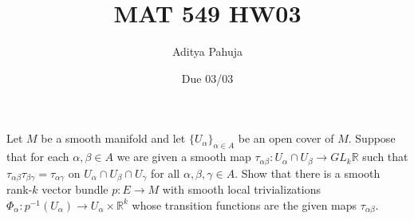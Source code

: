 \documentclass[10pt]{article}
\title{MAT 549 HW03}
\author{\large Aditya Pahuja}
\date{\large Due 03/03}
\providecommand{\RR}{\mathbb R}
\providecommand{\inv}{^{-1}}
\begin{document}
\maketitle

\begin{problem}
    Let $M$ be a smooth manifold and let $\{U_\alpha\}_{\alpha\in A}$
    be an open cover of $M$. Suppose that for each
    $\alpha,\beta\in A$ we are given a smooth map
    $\tau_{\alpha\beta}\colon U_{\alpha}\cap U_\beta\to GL_k\RR$
    such that $\tau_{\alpha\beta}\tau_{\beta\gamma} = \tau_{\alpha\gamma}$
    on $U_\alpha\cap U_\beta\cap U_\gamma$ for all
    $\alpha,\beta,\gamma\in A$. Show that there is
    a smooth rank-$k$ vector bundle $p\colon E\to M$
    with smooth local trivializations
    $\Phi_\alpha\colon p\inv(U_\alpha)\to U_\alpha\times\RR^k$
    whose transition functions are the given maps $\tau_{\alpha\beta}$.
\end{problem}
\end{document}
